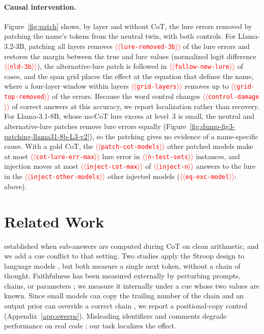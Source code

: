 \documentclass[11pt]{article}
\providecommand{\NUM}[1]{\textcolor{red}{$\langle\langle$\texttt{#1}$\rangle\rangle$}}
\begin{document}
\paragraph{Causal intervention.} Figure~\ref{fig:patch} shows, by layer and without CoT, the lure
errors removed by patching the name's tokens from the neutral twin, with both controls. For Llama-3.2-3B, patching all layers removes \NUM{lure-removed-3b} of the lure errors and
restores the margin between the true and lure values (normalized logit difference
\NUM{nld-3b}), the alternative-lure patch is followed in \NUM{follow-new-lure} of cases, and the
span grid places the effect at the equation that defines the name, where a four-layer window
within layers \NUM{grid-layers} removes up to \NUM{grid-top-removed} of the errors. Because the word control changes \NUM{control-damage} of correct answers at this
accuracy, we report localization rather than recovery. For Llama-3.1-8B, whose no-CoT lure excess at level~3 is small, the neutral and
alternative-lure patches remove lure errors equally
(Figure~\ref{fig:dump-fig3-patching-llama31-8b-L3-v2}), so the patching gives no evidence of a
name-specific cause. With a gold CoT, the \NUM{patch-cot-models} other patched models make at most \NUM{cot-lure-err-max} lure error in \NUM{n-test-sets} instances,
and injection moves at most \NUM{inject-cot-max} of \NUM{inject-n} answers to the lure in the
\NUM{inject-other-models} other injected models (\NUM{eq-exc-model}: above).


\section{Related Work}

\citet{kudo2026faithful} established when sub-answers are computed during CoT on clean
arithmetic, and we add a cue conflict to that setting. Two studies apply the Stroop design to language models
\cite{wang2026stroop,hu2026conflict}, but both measure a single next token, without a chain of
thought. Faithfulness has been measured externally by perturbing prompts, chains, or parameters
\cite{turpin2023unfaithful,lanham2023measuring,chen2025reasoning,tutek2025unlearning}; we measure
it internally under a cue whose two values are known. Since small models can
copy the trailing number of the chain \cite{liu2026readout} and an output prior can override a
correct chain \cite{prabhakar2024deciphering}, we report a positional-copy control
(Appendix~\ref{app:sweeps}). Misleading identifiers and comments degrade performance on real code
\cite{le2026obfuscated,le2025names,lam2025codecrash}; our task localizes the effect.
\end{document}
